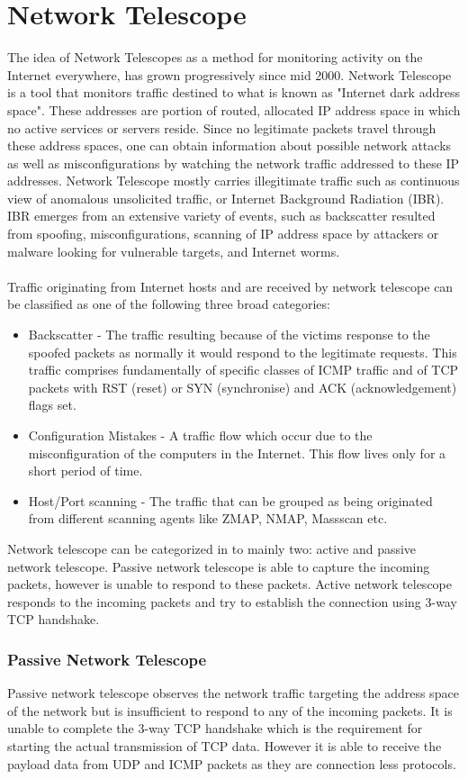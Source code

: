 	\section{Network Telescope}
	The idea of Network Telescopes as a method for monitoring activity on the Internet everywhere, has grown progressively since mid 2000.
	Network Telescope is a tool that monitors traffic destined to what is known as "Internet dark address space".
	These addresses are portion of routed, allocated IP address space in which no active services or servers reside.
	Since no legitimate packets travel through these address spaces, one can obtain information about possible network attacks as well as misconfigurations by watching the network traffic addressed to these IP addresses.
	Network Telescope  mostly carries  illegitimate traffic such as continuous view of anomalous unsolicited traffic, or Internet Background Radiation (IBR).
	IBR emerges from an extensive variety of events, such as backscatter resulted from spoofing, misconfigurations, scanning of IP address space by attackers or malware looking for vulnerable targets, and Internet worms.\\\\
	Traffic originating from Internet hosts and are received by network telescope can be classified as one of the following three broad categories:
	\begin{itemize}
	\item Backscatter - The traffic resulting because of the victims response to the spoofed packets as normally it would respond to the legitimate requests.
	This traffic comprises fundamentally of specific classes of ICMP traffic and of TCP packets with RST (reset) or SYN (synchronise) and ACK (acknowledgement) flags set.
	\item Configuration Mistakes - A traffic flow which occur due to the misconfiguration of the computers in the Internet. 
	This flow lives only for a short period of time.
	\item Host/Port scanning - The traffic that can be grouped as being originated from different scanning agents like ZMAP, NMAP, Massscan etc.
	\end{itemize} 
    Network telescope can be categorized in to mainly two: active and passive network telescope.
    Passive network telescope is able to capture the incoming packets, however is unable to respond to these packets.
    Active network telescope responds to the incoming packets and try to establish the connection using 3-way TCP handshake.
    \subsubsection{Passive Network Telescope}
    Passive network telescope observes the network traffic targeting the address space of the network but is insufficient to respond to any of the incoming packets.
    It is unable to complete the 3-way TCP handshake which is the requirement for starting the actual transmission of TCP data.
    However it is able to receive the payload data from UDP and ICMP packets as they are connection less protocols.
